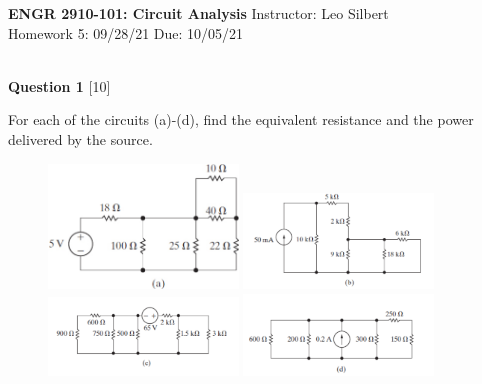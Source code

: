 \documentclass[12pt]{article}
\begin{document}

\begin{center}
\hfil
{\large\bf {ENGR 2910-101: Circuit Analysis}}
\hfill Instructor: Leo Silbert \\
Homework 5: 09/28/21 \hfill Due: 10/05/21\\
\hrulefill\\
\end{center}




\noindent
{\bf Question 1} [10] %

For each of the circuits (a)-(d), find the equivalent resistance and the power delivered by the source. 
\begin{figure}[h!]
  \centering 
 \vspace{-0.1in}
 \includegraphics[clip,width=0.45\textwidth]{Fig3-3a.png}
 \includegraphics[clip,width=0.45\textwidth]{Fig3-3b.png}\\
 \includegraphics[clip,width=0.45\textwidth]{Fig3-3c.png}
 \includegraphics[clip,width=0.45\textwidth]{Fig3-3d.png}
\end{figure}
\end{document}
